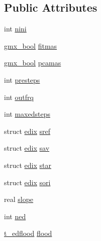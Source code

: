 \subsection*{\-Public \-Attributes}
\begin{DoxyCompactItemize}
\item 
int \hyperlink{structedipar_a954b2e4407771bf07444eb57274a11d5}{nini}
\item 
\hyperlink{include_2types_2simple_8h_a8fddad319f226e856400d190198d5151}{gmx\-\_\-bool} \hyperlink{structedipar_a22d1ddf605f349a1e1903fc95ec531ca}{fitmas}
\item 
\hyperlink{include_2types_2simple_8h_a8fddad319f226e856400d190198d5151}{gmx\-\_\-bool} \hyperlink{structedipar_a8a2f2a0f0a8789abe0f812f78c844fb0}{pcamas}
\item 
int \hyperlink{structedipar_a3cc5c66d1ed5e098ce83face78f5608d}{presteps}
\item 
int \hyperlink{structedipar_ae232fb973de018543bacb697be0e3e0c}{outfrq}
\item 
int \hyperlink{structedipar_a2c2c8059df648128f8220b1cc2bdea36}{maxedsteps}
\item 
struct \hyperlink{structedix}{edix} \hyperlink{structedipar_a3e5e5657da77e6acec2be3f4de7e5371}{sref}
\item 
struct \hyperlink{structedix}{edix} \hyperlink{structedipar_a1dd26fec1057334ce697a6e8578d1a1c}{sav}
\item 
struct \hyperlink{structedix}{edix} \hyperlink{structedipar_a17b403d270fabf0b56901dc27c97cf8b}{star}
\item 
struct \hyperlink{structedix}{edix} \hyperlink{structedipar_acececcf13dbb1e7e87d34a4538eb48dd}{sori}
\item 
real \hyperlink{structedipar_a5c51b812eefa1f9ce0698ae0553e3c6c}{slope}
\item 
int \hyperlink{structedipar_a95a4d9d6fea6b242f7fded02995d0376}{ned}
\item 
\hyperlink{structt__edflood}{t\-\_\-edflood} \hyperlink{structedipar_ad01fd4d0a2936de48b0c09e27eeb8748}{flood}
\end{DoxyCompactItemize}


